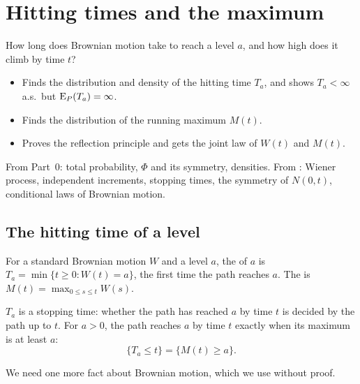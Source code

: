 \chapter{Hitting times and the maximum}
\label{ch:hitting}

\begin{question}
How long does Brownian motion take to reach a level $a$, and how high does it climb by time $t$?
\end{question}

\begin{whatfor}
\begin{itemize}
  \item Finds the distribution and density of the hitting time $T_a$, and shows $T_a<\infty$ a.s.\ but $\operatorname{E}_P(T_a)=\infty$.
  \item Finds the distribution of the running maximum $M(t)$.
  \item Proves the reflection principle and gets the joint law of $W(t)$ and $M(t)$.
\end{itemize}
\end{whatfor}

\begin{prereq}
From Part~0: total probability, $\Phi$ and its symmetry, densities. From : Wiener process, independent increments, stopping times, the symmetry of $N(0,t)$, conditional laws of Brownian motion.
\end{prereq}

\section{The hitting time of a level}

\begin{definition}
For a standard Brownian motion $W$ and a level $a$, the  of $a$ is $T_a=\min\{t\ge0:W(t)=a\}$, the first time the path reaches $a$. The  is $M(t)=\max_{0\le s\le t}W(s)$.
\end{definition}

$T_a$ is a stopping time: whether the path has reached $a$ by time $t$ is decided by the path up to $t$. For $a>0$, the path reaches $a$ by time $t$ exactly when its maximum is at least $a$:
\[
  \{T_a\le t\}=\{M(t)\ge a\}.
\]

We need one more fact about Brownian motion, which we use without proof.


